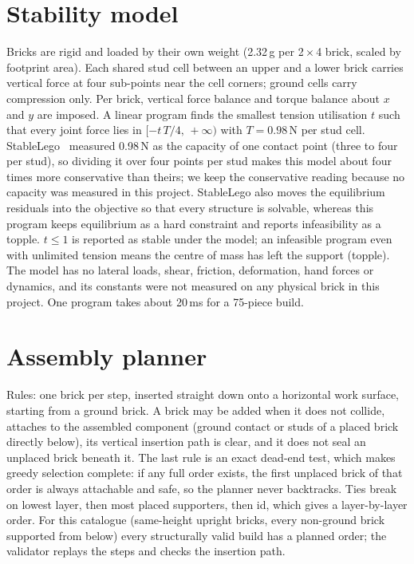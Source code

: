 \section{Stability model}
\label{app:stability}
Bricks are rigid and loaded by their own weight (2.32\,g per 2\,$\times$\,4 brick, scaled by footprint area).
Each shared stud cell between an upper and a lower brick carries vertical force at four sub-points near the cell
corners; ground cells carry compression only. Per brick, vertical force balance and torque balance about $x$ and $y$
are imposed. A linear program finds the smallest tension utilisation $t$ such that every joint force lies in
$[-t\,T/4,\,+\infty)$ with $T = 0.98$\,N per stud cell. StableLego~\citep{liu2024stablelego} measured 0.98\,N as the
capacity of one contact point (three to four per stud), so dividing it over four points per stud makes this model
about four times more conservative than theirs; we keep the conservative reading because no capacity was measured in
this project. StableLego also moves the equilibrium residuals into the objective so that every structure is
solvable, whereas this program keeps equilibrium as a hard constraint and reports infeasibility as a topple.
$t \le 1$ is reported as stable under the model; an infeasible program even with unlimited tension means the centre
of mass has left the support (topple). The model has no lateral loads, shear, friction, deformation, hand forces or
dynamics, and its constants were not measured on any physical brick in this project. One program takes about 20\,ms
for a 75-piece build.

\section{Assembly planner}
\label{app:planner}
Rules: one brick per step, inserted straight down onto a horizontal work surface, starting from a ground brick. A
brick may be added when it does not collide, attaches to the assembled component (ground contact or studs of a placed
brick directly below), its vertical insertion path is clear, and it does not seal an unplaced brick beneath it. The
last rule is an exact dead-end test, which makes greedy selection complete: if any full order exists, the first
unplaced brick of that order is always attachable and safe, so the planner never backtracks. Ties break on lowest
layer, then most placed supporters, then id, which gives a layer-by-layer order. For this catalogue (same-height
upright bricks, every non-ground brick supported from below) every structurally valid build has a planned order; the
validator replays the steps and checks the insertion path.

